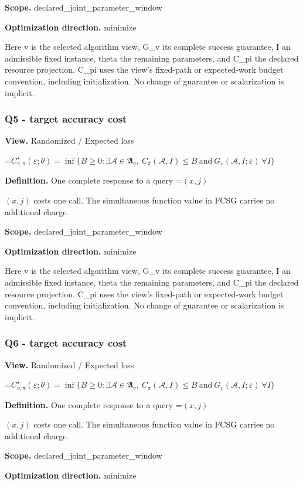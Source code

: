 \documentclass[10pt,a4paper]{article}
\newcommand{\AtlasMath}[1]{\par\begingroup\centering\setbox0=\hbox{$\displaystyle #1$}\ifdim\wd0>1.4\linewidth\typeout{ATLAS WIDE FORMULA: \the\wd0}\fi\ifdim\wd0>\linewidth\resizebox{\linewidth}{!}{\box0}\else\box0\fi\par\endgroup}
\newcommand{\AtlasInlineMath}[1]{\begingroup\setbox0=\hbox{$#1$}\ifdim\wd0>.4\linewidth\endgroup\AtlasMath{#1}\else\endgroup$#1$\fi}
\begin{document}
\textbf{Scope.} declared\_joint\_parameter\_window

\textbf{Optimization direction.} minimize

Here v is the selected algorithm view, G\_v its complete success guarantee, I an admissible fixed instance, theta the remaining parameters, and C\_pi the declared resource projection. C\_pi uses the view's fixed-path or expected-work budget convention, including initialization. No change of guarantee or scalarization is implicit.

\subsubsection{Q5 - target accuracy cost}
\textbf{View.} Randomized / Expected loss

\AtlasMath{C^\star_{v,\pi}(\varepsilon;\theta)=\inf\{B\ge0:\exists\mathcal A\in\mathfrak A_v,\ C_\pi(\mathcal A,I)\le B\ \text{and}\ G_v(\mathcal A,I;\varepsilon)\ \forall I\}}
\textbf{Definition.} One complete response to a query \AtlasInlineMath{(x,j)} costs one call. The simultaneous function value in FCSG carries no additional charge.

\textbf{Scope.} declared\_joint\_parameter\_window

\textbf{Optimization direction.} minimize

Here v is the selected algorithm view, G\_v its complete success guarantee, I an admissible fixed instance, theta the remaining parameters, and C\_pi the declared resource projection. C\_pi uses the view's fixed-path or expected-work budget convention, including initialization. No change of guarantee or scalarization is implicit.

\subsubsection{Q6 - target accuracy cost}
\textbf{View.} Randomized / Expected loss

\AtlasMath{C^\star_{v,\pi}(\varepsilon;\theta)=\inf\{B\ge0:\exists\mathcal A\in\mathfrak A_v,\ C_\pi(\mathcal A,I)\le B\ \text{and}\ G_v(\mathcal A,I;\varepsilon)\ \forall I\}}
\textbf{Definition.} One complete response to a query \AtlasInlineMath{(x,j)} costs one call. The simultaneous function value in FCSG carries no additional charge.

\textbf{Scope.} declared\_joint\_parameter\_window

\textbf{Optimization direction.} minimize
\end{document}
